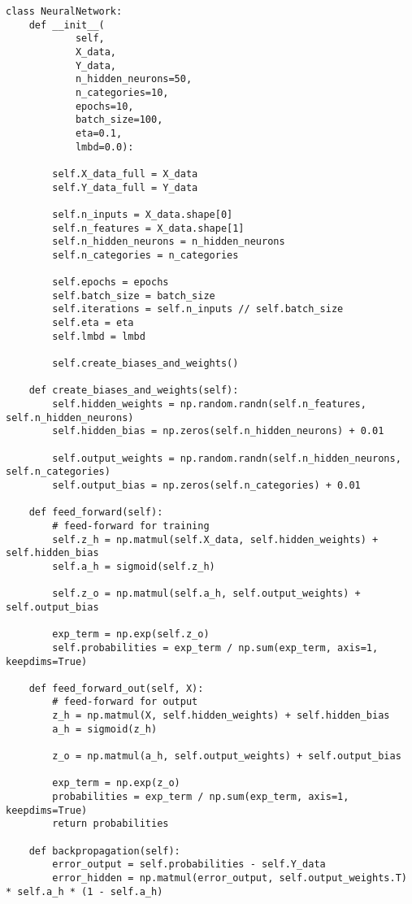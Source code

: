 \begin{verbatim}
class NeuralNetwork:
    def __init__(
            self,
            X_data,
            Y_data,
            n_hidden_neurons=50,
            n_categories=10,
            epochs=10,
            batch_size=100,
            eta=0.1,
            lmbd=0.0):

        self.X_data_full = X_data
        self.Y_data_full = Y_data

        self.n_inputs = X_data.shape[0]
        self.n_features = X_data.shape[1]
        self.n_hidden_neurons = n_hidden_neurons
        self.n_categories = n_categories

        self.epochs = epochs
        self.batch_size = batch_size
        self.iterations = self.n_inputs // self.batch_size
        self.eta = eta
        self.lmbd = lmbd

        self.create_biases_and_weights()

    def create_biases_and_weights(self):
        self.hidden_weights = np.random.randn(self.n_features, self.n_hidden_neurons)
        self.hidden_bias = np.zeros(self.n_hidden_neurons) + 0.01

        self.output_weights = np.random.randn(self.n_hidden_neurons, self.n_categories)
        self.output_bias = np.zeros(self.n_categories) + 0.01

    def feed_forward(self):
        # feed-forward for training
        self.z_h = np.matmul(self.X_data, self.hidden_weights) + self.hidden_bias
        self.a_h = sigmoid(self.z_h)

        self.z_o = np.matmul(self.a_h, self.output_weights) + self.output_bias

        exp_term = np.exp(self.z_o)
        self.probabilities = exp_term / np.sum(exp_term, axis=1, keepdims=True)

    def feed_forward_out(self, X):
        # feed-forward for output
        z_h = np.matmul(X, self.hidden_weights) + self.hidden_bias
        a_h = sigmoid(z_h)

        z_o = np.matmul(a_h, self.output_weights) + self.output_bias
        
        exp_term = np.exp(z_o)
        probabilities = exp_term / np.sum(exp_term, axis=1, keepdims=True)
        return probabilities

    def backpropagation(self):
        error_output = self.probabilities - self.Y_data
        error_hidden = np.matmul(error_output, self.output_weights.T) * self.a_h * (1 - self.a_h)


\end{verbatim}
